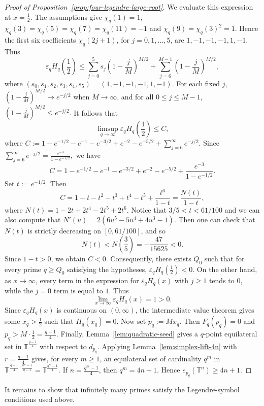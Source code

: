 \documentclass[11pt]{article}
\theoremstyle{definition}
\newcommand{\T}{\mathbb T}
\begin{document}
\begin{proof}[Proof of Proposition~\ref{prop:four-legendre-large-root}]
We evaluate this expression at \(x=\frac12\). The assumptions give
\(
\chi_q(1)=1,\)
\(
\chi_q(3)=\chi_q(5)=\chi_q(7)=\chi_q(11)=-1\)
and 
\(
\chi_q(9)=\chi_q(3)^2=1.
\)
Hence the first six coefficients \(\chi_q(2j+1)\), for \(j=0,1,\dots,5\), are
\(1,-1,-1,-1,1,-1.\)
Thus
\[
\varepsilon_q H_q\!\left(\frac12\right)
\le
\sum_{j=0}^{5}s_j
\left(1-\frac{j}{M}\right)^{M/2}
+
\sum_{j=6}^{M-1}
\left(1-\frac{j}{M}\right)^{M/2},
\]
where
\(
(s_0,s_1,s_2,s_3,s_4,s_5)=(1,-1,-1,-1,1,-1).
\)
For each fixed \(j\),
\(
\left(1-\frac{j}{M}\right)^{M/2}\rightarrow e^{-j/2}\)
when \(M\to\infty\),
and for all \(0\le j\le M-1\),
\(
\left(1-\frac{j}{M}\right)^{M/2}\le e^{-j/2}.
\)
It follows that
\[
\limsup_{q\to\infty}
\varepsilon_q H_q\!\left(\frac12\right)
\le C,
\]
where
\(
C:=
1-e^{-1/2}-e^{-1}-e^{-3/2}+e^{-2}-e^{-5/2}
+
\sum_{j=6}^{\infty}e^{-j/2}.
\)
Since
\(
\sum_{j=6}^{\infty}e^{-j/2}
=
\frac{e^{-3}}{1-e^{-1/2}},
\)
we have
\[
C=
1-e^{-1/2}-e^{-1}-e^{-3/2}+e^{-2}-e^{-5/2}
+
\frac{e^{-3}}{1-e^{-1/2}}.
\]
Set \(t:=e^{-1/2}\). Then
\[
C
=
1-t-t^2-t^3+t^4-t^5+\frac{t^6}{1-t}
=
\frac{N(t)}{1-t},
\]
where
\(
N(t)=1-2t+2t^4-2t^5+2t^6.
\)
Notice that \(3/5<t<61/100\) and we can also compute that
\(
N'(u)=2(6u^5-5u^4+4u^3-1).
\)
Then one can check that \(N(t)\) is strictly decreasing on
\([0,61/100]\), and so
\[
N(t)<N\!\left(\frac35\right)
=
-\frac{47}{15625}<0.
\]
Since \(1-t>0\), we obtain
\(
C<0.
\)
Consequently, there exists \(Q_0\) such that for every prime \(q\ge Q_0\)
satisfying the hypotheses,
\(
\varepsilon_qH_q\!\left(\frac12\right)<0.
\)
On the other hand, as \(x\to\infty\), every term in the expression for
\(\varepsilon_qH_q(x)\) with \(j\ge1\) tends to \(0\), while the \(j=0\) term is
equal to \(1\). Thus
\[
\lim_{x\to\infty}\varepsilon_qH_q(x)=1>0.
\]
Since \(\varepsilon_qH_q(x)\) is continuous on \((0,\infty)\), the intermediate
value theorem gives some
\(
x_q>\frac12
\)
such that
\(
H_q(x_q)=0.
\)
Now set
\(
p_q:=Mx_q.
\)
Then
\(
F_q(p_q)=0
\)
and
\(
p_q>M\cdot\frac12=\frac{q-1}{4}.
\)
Finally, Lemma~\ref{lem:quadratic-seed} gives a \(q\)-point equilateral set in
\(
\T^{\frac{q-1}{4}}
\)
with respect to \(d_{p_q}\). Applying Lemma~\ref{lem:simplex-lift-4n} with
\(
r=\frac{q-1}{4}
\)
gives, for every \(m\ge1\), an equilateral set of cardinality \(q^m\) in
\(
\T^{\,\frac{q-1}{4}\cdot\frac{q^m-1}{q-1}}
=
\T^{\frac{q^{m}-1}{4}}.
\)
If \(n=\frac{q^{m}-1}{4}\), then \(q^m=4n+1\). Hence
\(
e_{p_q}(\T^n)\ge4n+1.
\)
    
\end{proof}

It remains to show that infinitely many primes satisfy the Legendre-symbol
conditions used above.
\end{document}
